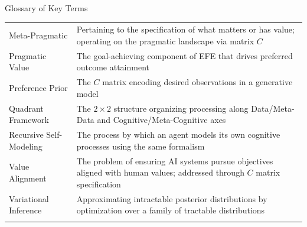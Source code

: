 \documentclass[
  ignorenonframetext,
]{beamer}
\begin{document}
\begin{frame}{Glossary of Key Terms}
{\begin{longtable}[]{@{}
  >{\raggedright\arraybackslash}p{}
  >{\raggedright\arraybackslash}p{}@{}}
Meta-Pragmatic & Pertaining to the specification of what matters or has
value; operating on the pragmatic landscape via matrix \(C\) \\
Pragmatic Value & The goal-achieving component of EFE that drives
preferred outcome attainment \\
Preference Prior & The \(C\) matrix encoding desired observations in a
generative model \\
Quadrant Framework & The \(2 \times 2\) structure organizing processing
along Data/Meta-Data and Cognitive/Meta-Cognitive axes \\
Recursive Self-Modeling & The process by which an agent models its own
cognitive processes using the same formalism \\
Value Alignment & The problem of ensuring AI systems pursue objectives
aligned with human values; addressed through \(C\) matrix
specification \\
Variational Inference & Approximating intractable posterior
distributions by optimization over a family of tractable
distributions \\
\bottomrule\noalign{}
\end{longtable}
}
\end{frame}
\end{document}

